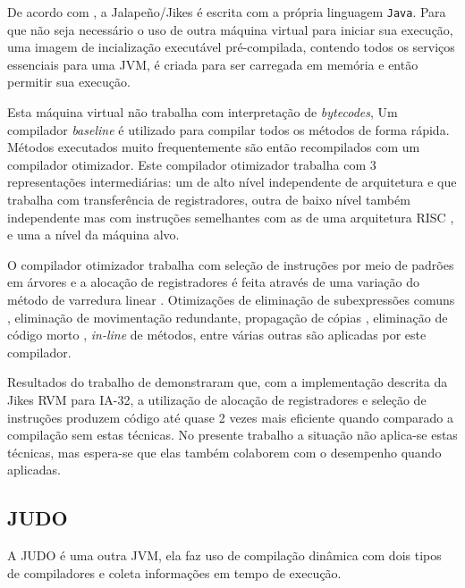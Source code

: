 De acordo com , a Jalapeño/Jikes é escrita com a
própria linguagem
\texttt{Java}. Para que não seja necessário o uso de outra máquina
virtual para iniciar sua execução, uma imagem de incialização
executável pré-compilada, contendo todos os serviços essenciais para
uma JVM, é criada para ser carregada em memória e então permitir sua
execução.

Esta máquina virtual não trabalha com interpretação de
\textit{bytecodes},
Um compilador \textit{baseline} é utilizado para
compilar todos os métodos de forma rápida. Métodos executados muito
frequentemente são então recompilados com um compilador otimizador.
Este compilador otimizador trabalha com 3 representações
intermediárias: um de alto nível independente de arquitetura e que
trabalha com transferência de registradores, outra de
baixo nível também independente mas com instruções semelhantes com as
de uma arquitetura RISC \cite{risc}, e uma a nível da máquina alvo.

O compilador otimizador trabalha com seleção de instruções por meio de
padrões em árvores \cite{instrselect} e a
alocação de registradores é feita através de uma variação do método
de varredura linear \cite{linear_scan_regalloc}. Otimizações de
eliminação de subexpressões comuns \cite{muchnick}, eliminação de
movimentação redundante, propagação de cópias \cite{muchnick},
eliminação de código morto \cite{allen_kennedy}, \textit{in-line} de
métodos, entre várias outras são aplicadas por este compilador.

Resultados do trabalho de  demonstraram que, com a
implementação descrita da Jikes RVM para IA-32, a
utilização de alocação de registradores e seleção de instruções
produzem código até quase 2 vezes mais eficiente quando comparado a
compilação sem estas técnicas. No presente trabalho a situação não
aplica-se estas técnicas, mas espera-se que elas também colaborem com
o desempenho quando aplicadas.


\subsection{JUDO}

A JUDO \cite{judo} é uma outra JVM, ela faz uso
de compilação dinâmica com dois tipos de compiladores e coleta
informações em tempo de execução.

